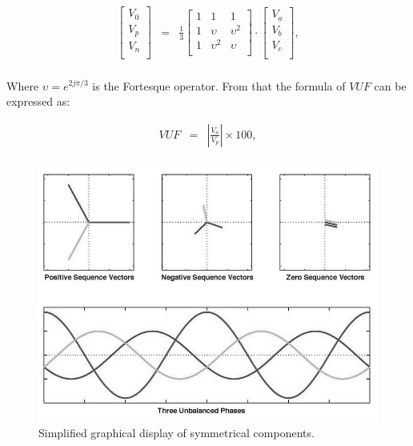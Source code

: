 	\begin{equation}
        \begin{array}{rcl}
            \begin{bmatrix}
						V_0\\
						V_p\\
						V_n\\
						\end{bmatrix}&=&
						\frac{1}{3}\begin{bmatrix}
						1&1&1\\
						1&\upsilon&\upsilon^2\\
						1&\upsilon^2&\upsilon\\
						\end{bmatrix}\cdot
						\begin{bmatrix}
						V_a\\
						V_b\\
						V_c\\
						\end{bmatrix},\\
        \end{array}
        \label{BASICUNB:equ:symmetry}
    \end{equation}
	
	Where $\upsilon=e^{2j\pi/3}$ is the Fortesque operator. From that the formula of $VUF$ can be expressed as:
	
	
	\begin{equation}
        \begin{array}{rcl}
            VUF&=&\left|\frac{V_n}{V_p}\right|\times100,\\					
        \end{array}
        \label{BASICUNB:equ:VUF}
    \end{equation}

    \begin{figure}[h]
         \centering
         \includegraphics[width=.7\textwidth]{Unblance_EPS_Pics/Symmetrical_components_gray.jpg}
         \caption{Simplified graphical display of symmetrical components.}
         \label{BASICUNB:fig:symmetrical_simple}
     \end{figure}
	
